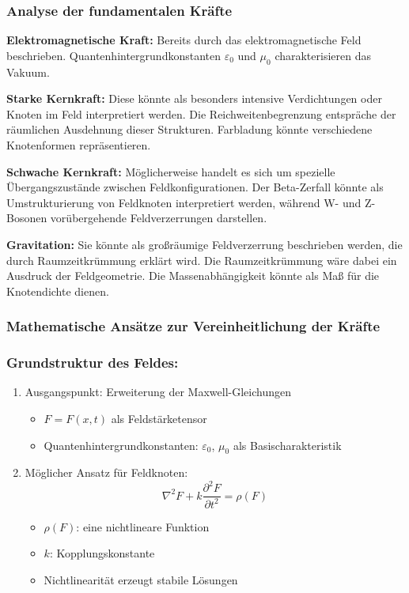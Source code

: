 \documentclass[12pt,a4paper]{article}
\begin{document}
	\subsubsection{Analyse der fundamentalen Kräfte}
	
	\textbf{Elektromagnetische Kraft:} Bereits durch das elektromagnetische Feld beschrieben. Quantenhintergrundkonstanten $\varepsilon_0$ und $\mu_0$ charakterisieren das Vakuum.
	
	\textbf{Starke Kernkraft:} Diese könnte als besonders intensive Verdichtungen oder \glqq Knoten\grqq{} im Feld interpretiert werden. Die Reichweitenbegrenzung entspräche der räumlichen Ausdehnung dieser Strukturen. Farbladung könnte verschiedene Knotenformen repräsentieren.
	
	\textbf{Schwache Kernkraft:} Möglicherweise handelt es sich um spezielle Übergangszustände zwischen Feldkonfigurationen. Der Beta-Zerfall könnte als Umstrukturierung von Feldknoten interpretiert werden, während W- und Z-Bosonen vorübergehende Feldverzerrungen darstellen.
	
	\textbf{Gravitation:} Sie könnte als großräumige Feldverzerrung beschrieben werden, die durch Raumzeitkrümmung erklärt wird. Die Raumzeitkrümmung wäre dabei ein Ausdruck der Feldgeometrie. Die Massenabhängigkeit könnte als Maß für die \glqq Knotendichte\grqq{} dienen.
	
	\subsubsection{Mathematische Ansätze zur Vereinheitlichung der Kräfte}
	
	\subsubsection{Grundstruktur des Feldes:}
	
	\begin{enumerate}
		\item Ausgangspunkt: Erweiterung der Maxwell-Gleichungen
		\begin{itemize}
			\item $F = F(x,t)$ als Feldstärketensor
			\item Quantenhintergrundkonstanten: $\varepsilon_0$, $\mu_0$ als Basischarakteristik
		\end{itemize}
		\item Möglicher Ansatz für Feldknoten:
		\begin{equation}
			\nabla^2 F + k \frac{\partial^2 F}{\partial t^2} = \rho(F)
		\end{equation}
		\begin{itemize}
			\item $\rho(F)$: eine nichtlineare Funktion
			\item $k$: Kopplungskonstante
			\item Nichtlinearität erzeugt stabile Lösungen
		\end{itemize}
	\end{enumerate}
	
\end{document}
